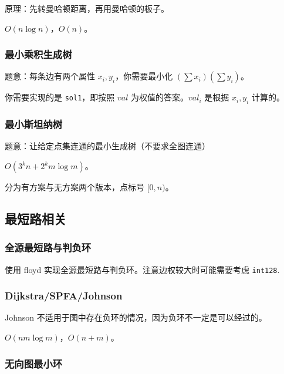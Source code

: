 \documentclass[12pt]{ctexart}
\begin{document}
原理：先转曼哈顿距离，再用曼哈顿的板子。

$O(n\log n)$，$O(n)$。



\subsubsection{最小乘积生成树}

题意：每条边有两个属性 $x_i,y_i$，你需要最小化 $(\sum x_i)(\sum y_i)$。

你需要实现的是 \verb|sol1|，即按照 $val$ 为权值的答案。$val_i$ 是根据 $x_i,y_i$ 计算的。



\subsubsection{最小斯坦纳树}

题意：让给定点集连通的最小生成树（不要求全图连通）

$O(3^kn+2^km\log m)$。

分为有方案与无方案两个版本，点标号 $[0,n)$。




\subsection{最短路相关}

\subsubsection{全源最短路与判负环}

使用 floyd 实现全源最短路与判负环。注意边权较大时可能需要考虑 \verb|int128|.



\subsubsection{Dijkstra/SPFA/Johnson}

Johnson 不适用于图中存在负环的情况，因为负环不一定是可以经过的。

$O(nm\log m)$，$O(n+m)$。


\subsubsection{无向图最小环}
\end{document}
